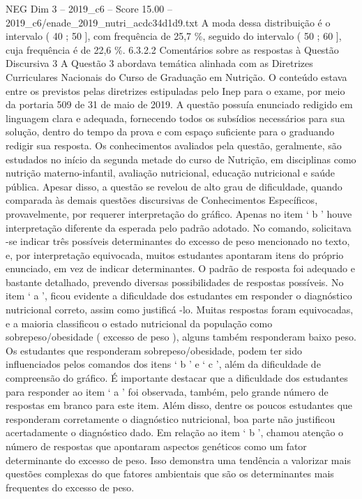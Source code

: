 \begin{textsample}{NEG Dim 3 – 2019\_c6 – Score 15.00 – 2019\_c6/enade\_2019\_nutri\_acdc34d1d9.txt}
A moda dessa distribuição é o intervalo ( 40 ; 50 ], com frequência de 25,7 \%, seguido do intervalo ( 50 ; 60 ], cuja frequência é de 22,6 \%. 6.3.2.2 Comentários sobre as respostas à Questão Discursiva 3 A Questão 3 abordava temática alinhada com as Diretrizes Curriculares Nacionais do Curso de Graduação em Nutrição.
O conteúdo estava entre os previstos pelas diretrizes estipuladas pelo Inep para o exame, por meio da portaria 509 de 31 de maio de 2019.
A questão possuía enunciado redigido em linguagem clara e adequada, fornecendo todos os subsídios necessários para sua solução, dentro do tempo da prova e com espaço suficiente para o graduando redigir sua resposta.
Os conhecimentos avaliados pela questão, geralmente, são estudados no início da segunda metade do curso de Nutrição, em disciplinas como nutrição materno-infantil, avaliação nutricional, educação nutricional e saúde pública.
Apesar disso, a questão se revelou de alto grau de dificuldade, quando comparada às demais questões discursivas de Conhecimentos Específicos, provavelmente, por requerer interpretação do gráfico.
Apenas no item ‘ b ’ houve interpretação diferente da esperada pelo padrão adotado.
No comando, solicitava -se indicar três possíveis determinantes do excesso de peso mencionado no texto, e, por interpretação equivocada, muitos estudantes apontaram itens do próprio enunciado, em vez de indicar determinantes.
O padrão de resposta foi adequado e bastante detalhado, prevendo diversas possibilidades de respostas possíveis.
No item ‘ a ’, ficou evidente a dificuldade dos estudantes em responder o diagnóstico nutricional correto, assim como justificá -lo.
Muitas respostas foram equivocadas, e a maioria classificou o estado nutricional da população como sobrepeso/obesidade ( excesso de peso ), alguns também responderam baixo peso.
Os estudantes que responderam sobrepeso/obesidade, podem ter sido influenciados pelos comandos dos itens ‘ b ’ e ‘ c ’, além da dificuldade de compreensão do gráfico.
É importante destacar que a dificuldade dos estudantes para responder ao item ‘ a ’ foi observada, também, pelo grande número de respostas em branco para este item.
Além disso, dentre os poucos estudantes que responderam corretamente o diagnóstico nutricional, boa parte não justificou acertadamente o diagnóstico dado.
Em relação ao item ‘ b ’, chamou atenção o número de respostas que apontaram aspectos genéticos como um fator determinante do excesso de peso.
Isso demonstra uma tendência a valorizar mais questões complexas do que fatores ambientais que são os determinantes mais frequentes do excesso de peso.

\end{textsample}
